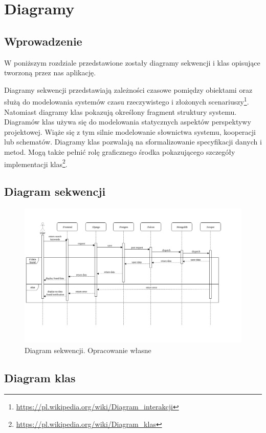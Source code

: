 \chapter{Diagramy}

\section{Wprowadzenie}

W poniższym rozdziale przedstawione zostały diagramy sekwencji i klas opisujące tworzoną przez nas aplikację. 

Diagramy sekwencji przedstawiają zależności czasowe pomiędzy obiektami oraz służą do modelowania systemów czasu rzeczywistego i złożonych scenariuszy\footnote{\url{https://pl.wikipedia.org/wiki/Diagram_interakcji}}. Natomiast diagramy klas pokazują określony fragment struktury systemu. Diagramów klas używa się do modelowania statycznych aspektów perspektywy projektowej. Wiąże się z tym silnie modelowanie słownictwa systemu, kooperacji lub schematów. Diagramy klas pozwalają na sformalizowanie specyfikacji danych i metod. Mogą także pełnić rolę graficznego środka pokazującego szczegóły implementacji klas\footnote{\url{https://pl.wikipedia.org/wiki/Diagram_klas}}.
\newpage
\section{Diagram sekwencji}

\begin{figure}[h]
    \includegraphics[width=1.10\textwidth]{zdjecia/sekwencja}
    \caption{Diagram sekwencji. Opracowanie własne}
\end{figure}
\newpage

\section{Diagram klas}

